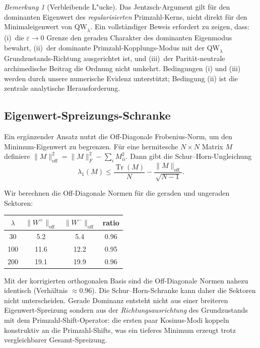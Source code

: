 ﻿\documentclass[12pt,a4paper]{article}
\theoremstyle{definition}
\theoremstyle{remark}
\newtheorem{remark}[theorem]{Bemerkung}
\begin{document}
\begin{remark}[Verbleibende L"ucke]
Das Jentzsch-Argument gilt für den dominanten Eigenwert des \emph{regularisierten} Primzahl-Kerns, nicht direkt für den Minimaleigenwert von $\mathrm{QW}_\lambda$. Ein vollständiger Beweis erfordert zu zeigen, dass: (i)~die $\varepsilon \to 0$ Grenze den geraden Charakter des dominanten Eigenmodus bewahrt, (ii)~der dominante Primzahl-Kopplungs-Modus mit der $\mathrm{QW}_\lambda$ Grundzustands-Richtung ausgerichtet ist, und (iii)~der Parität-neutrale archimedische Beitrag die Ordnung nicht umkehrt. Bedingungen (i) und (iii) werden durch unsere numerische Evidenz unterstützt; Bedingung (ii) ist die zentrale analytische Herausforderung.
\end{remark}

\subsection{Eigenwert-Spreizungs-Schranke}

Ein ergänzender Ansatz nutzt die Off-Diagonale Frobenius-Norm, um den Minimum-Eigenwert zu begrenzen. Für eine hermitesche $N \times N$ Matrix $M$ definiere $\|M\|_{\mathrm{off}}^2 = \|M\|_F^2 - \sum_i M_{ii}^2$. Dann gibt die Schur--Horn-Ungleichung
\[ \lambda_1(M) \leq \frac{\operatorname{Tr}(M)}{N} - \frac{\|M\|_{\mathrm{off}}}{\sqrt{N-1}}. \]

Wir berechnen die Off-Diagonale Normen für die geraden und ungeraden Sektoren:

\begin{center}
\begin{tabular}{cccc}
$\lambda$ & $\|W^+\|_{\mathrm{off}}$ & $\|W^-\|_{\mathrm{off}}$ & ratio \\
\hline
30  & 5.2 & 5.4 & 0.96 \\
100 & 11.6 & 12.2 & 0.95 \\
200 & 19.1 & 19.9 & 0.96
\end{tabular}
\end{center}

Mit der korrigierten orthogonalen Basis sind die Off-Diagonale Normen nahezu identisch (Verhältnis $\approx 0.96$). Die Schur--Horn-Schranke kann daher die Sektoren nicht unterscheiden. Gerade Dominanz entsteht nicht aus einer breiteren Eigenwert-Spreizung sondern aus der \emph{Richtungsausrichtung} des Grundzustands mit dem Primzahl-Shift-Operator: die ersten paar Kosinus-Modi koppeln konstruktiv an die Primzahl-Shifts, was ein tieferes Minimum erzeugt trotz vergleichbarer Gesamt-Spreizung.
\end{document}
